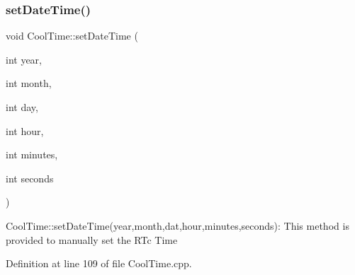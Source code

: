 \subsubsection{\texorpdfstring{set\+Date\+Time()}{setDateTime()}}
{\footnotesize\ttfamily void Cool\+Time\+::set\+Date\+Time (\begin{DoxyParamCaption}\item[{int}]{year,  }\item[{int}]{month,  }\item[{int}]{day,  }\item[{int}]{hour,  }\item[{int}]{minutes,  }\item[{int}]{seconds }\end{DoxyParamCaption})}

Cool\+Time\+::set\+Date\+Time(year,month,dat,hour,minutes,seconds)\+: This method is provided to manually set the R\+Tc Time 

Definition at line 109 of file Cool\+Time.\+cpp.


